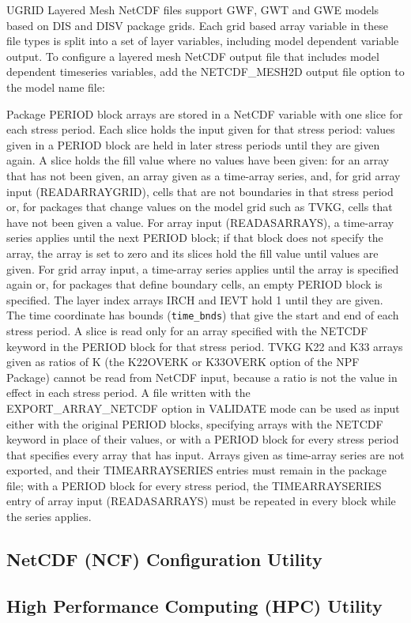 \mf UGRID Layered Mesh NetCDF files support GWF, GWT and GWE models based on DIS and DISV package grids. Each grid based array variable in these file types is split into a set of layer variables, including model dependent variable output. To configure a layered mesh NetCDF output file that includes model dependent timeseries variables, add the NETCDF\_MESH2D output file option to the model name file:


Package PERIOD block arrays are stored in a NetCDF variable with one slice for each stress period. Each slice holds the input given for that stress period: values given in a PERIOD block are held in later stress periods until they are given again. A slice holds the fill value where no values have been given: for an array that has not been given, an array given as a time-array series, and, for grid array input (READARRAYGRID), cells that are not boundaries in that stress period or, for packages that change values on the model grid such as TVKG, cells that have not been given a value. For array input (READASARRAYS), a time-array series applies until the next PERIOD block; if that block does not specify the array, the array is set to zero and its slices hold the fill value until values are given. For grid array input, a time-array series applies until the array is specified again or, for packages that define boundary cells, an empty PERIOD block is specified. The layer index arrays IRCH and IEVT hold 1 until they are given. The time coordinate has bounds (\texttt{time\_bnds}) that give the start and end of each stress period. A slice is read only for an array specified with the NETCDF keyword in the PERIOD block for that stress period. TVKG K22 and K33 arrays given as ratios of K (the K22OVERK or K33OVERK option of the NPF Package) cannot be read from NetCDF input, because a ratio is not the value in effect in each stress period. A file written with the EXPORT\_ARRAY\_NETCDF option in VALIDATE mode can be used as input either with the original PERIOD blocks, specifying arrays with the NETCDF keyword in place of their values, or with a PERIOD block for every stress period that specifies every array that has input. Arrays given as time-array series are not exported, and their TIMEARRAYSERIES entries must remain in the package file; with a PERIOD block for every stress period, the TIMEARRAYSERIES entry of array input (READASARRAYS) must be repeated in every block while the series applies.

\newpage
\subsection{NetCDF (NCF) Configuration Utility}


\newpage
\subsection{High Performance Computing (HPC) Utility}


